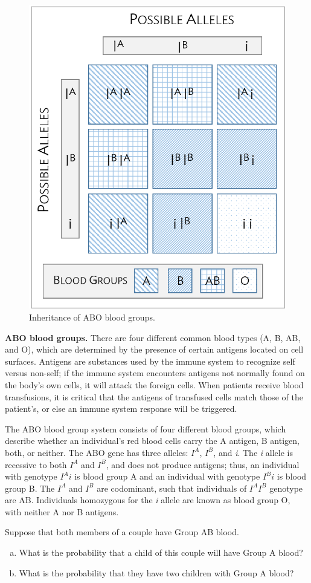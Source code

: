 \begin{figure}[h]
	\centering
	\includegraphics[height= 0.65\textwidth]{ch_probability_oi_biostat/figures/aboInheritance/aboInheritance.png}
	\caption{Inheritance of ABO blood groups.}
	\label{fig:aboInheritance}
\end{figure}

\begin{example}{\textbf{ABO blood groups.} There are four different common blood types (A, B, AB, and O), which are determined by the presence of certain antigens located on cell surfaces. Antigens are substances used by the immune system to recognize self versus non-self; if the immune system encounters antigens not normally found on the body's own cells, it will attack the foreign cells. When patients receive blood transfusions, it is critical that the antigens of transfused cells match those of the patient's, or else an immune system response will be triggered.
		
The ABO blood group system consists of four different blood groups, which describe whether an individual's red blood cells carry the A antigen, B antigen, both, or neither. The ABO gene has three alleles: ${I}^{A}$, ${I}^{B}$, and \textit{i}. The \textit{i} allele is recessive to both ${I}^{A}$ and ${I}^{B}$, and does not produce antigens; thus, an individual with genotype ${I}^{A}i$ is blood group A and an individual with genotype ${I}^{B}i$ is blood group B. The ${I}^{A}$ and ${I}^{B}$ are codominant, such that individuals of ${I}^{A}$${I}^{B}$ genotype are AB. Individuals homozygous for the \textit{i} allele are known as blood group O, with neither A nor B antigens.

Suppose that both members of a couple have Group AB blood.	
\begin{enumerate}[a)]
	\item What is the probability that a child of this couple will have Group A blood?
	\item What is the probability that they have two children with Group A blood?
\end{enumerate}	}

\end{example}


